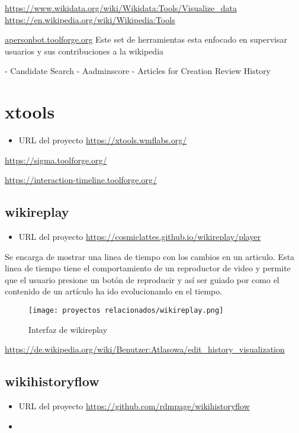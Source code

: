 \url{https://www.wikidata.org/wiki/Wikidata:Tools/Visualize_data}
\url{https://en.wikipedia.org/wiki/Wikipedia:Tools}

\url{apersonbot.toolforge.org}
Este set de herramientas esta enfocado en supervisar usuarios y sus contribuciones a la wikipedia

- Candidate Search
- Aadminscore
- Articles for Creation Review History

\section{xtools}
\begin{itemize}
    \item URL del proyecto \url{https://xtools.wmflabs.org/}
\end{itemize}


\url{https://sigma.toolforge.org/}


\url{https://interaction-timeline.toolforge.org/}


\subsection{wikireplay}
\begin{itemize}
    \item URL del proyecto \url{https://cosmiclattes.github.io/wikireplay/player}
\end{itemize}

Se encarga de mostrar una linea de tiempo con los cambios en un articulo. Esta linea de tiempo
tiene el comportamiento de un reproductor de video y permite que el usuario presione un botón de
reproducir y así ser guiado por como el contenido de un artículo ha ido evolucionando en el tiempo.

\begin{figure}[]
    \centering
    \texttt{[image: proyectos relacionados/wikireplay.png]}
    \caption{Interfaz de wikireplay}
    \label{wikireplay}
\end{figure}


\url{https://de.wikipedia.org/wiki/Benutzer:Atlasowa/edit_history_visualization}


\subsection{wikihistoryflow}

\begin{itemize}
    \item URL del proyecto \url{https://github.com/rdmpage/wikihistoryflow}
    \item
\end{itemize}

